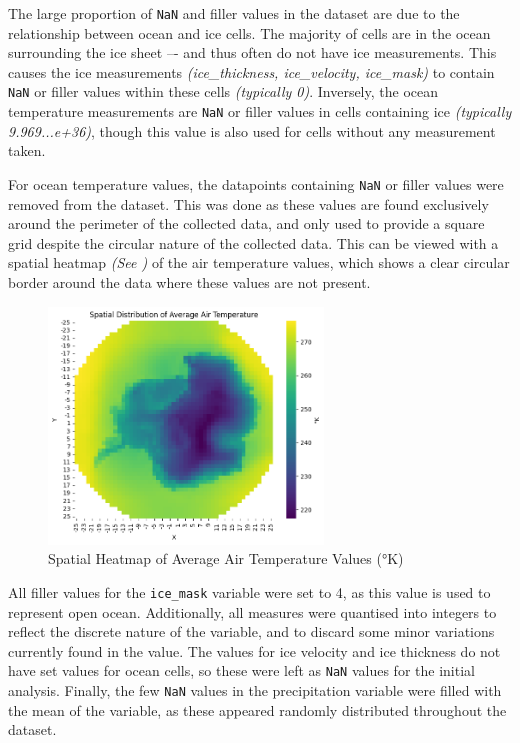 The large proportion of \texttt{NaN} and filler values in the dataset are due to the relationship between ocean and ice cells. The majority of cells are in the ocean surrounding the ice sheet –- and thus often do not have ice measurements. This causes the ice measurements \textit{(ice\_thickness, ice\_velocity, ice\_mask)} to contain \texttt{NaN} or filler values within these cells \textit{(typically 0)}. Inversely, the ocean temperature measurements are \texttt{NaN} or filler values in cells containing ice \textit{(typically 9.969...e+36)}, though this value is also used for cells without any measurement taken.

For ocean temperature values, the datapoints containing \texttt{NaN} or filler values were removed from the dataset. This was done as these values are found exclusively around the perimeter of the collected data, and only used to  provide a square grid despite the circular nature of the collected data. This can be viewed with a spatial heatmap \textit{(See )} of the air temperature values, which shows a clear circular border around the data where these values are not present.

\begin{figure}[ht]
  \centering
  \includegraphics[width=0.65\textwidth]{images/air_temperature/air_temperature_spatial_heatmap.png}
  \caption{Spatial Heatmap of Average Air Temperature Values (°K)}
  \label{fig:spatial_heatmap_air_temp}
\end{figure}

All filler values for the \texttt{ice\_mask} variable were set to 4, as this value is used to represent open ocean. Additionally, all measures were quantised into integers to reflect the discrete nature of the variable, and to discard some minor variations currently found in the value. The values for ice velocity and ice thickness do not have set values for ocean cells, so these were left as \texttt{NaN} values for the initial analysis. Finally, the few \texttt{NaN} values in the precipitation variable were filled with the mean of the variable, as these appeared randomly distributed throughout the dataset.

